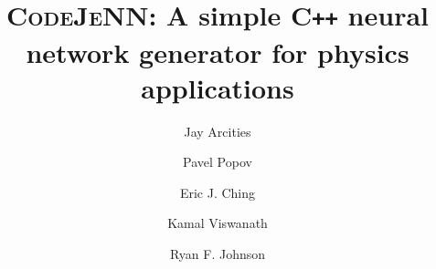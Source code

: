 \documentclass[preprint,12pt, a4paper]{elsarticle}
\begin{document}
\renewcommand{\labelenumii}{\arabic{enumi}.\arabic{enumii}}

\begin{frontmatter}


\title{\textsc{CodeJeNN}: A simple C\texttt{++} neural network generator for physics applications}


\author[SDSU]{Jay Arcities}
\author[SDSU]{Pavel Popov}
\author[NRL]{Eric J. Ching}
\author[NRL]{Kamal Viswanath}
\author[NRL]{Ryan F. Johnson}

\address[SDSU]{San Diego State University, Aerospace Engineering Department, San Diego, CA 92182}
\address[NRL]{U.S. Naval Research Laboratory, Laboratories of Computational Physics and Fluid Dynamics, Washington, DC 20375}



    


\end{frontmatter}
\end{document}
